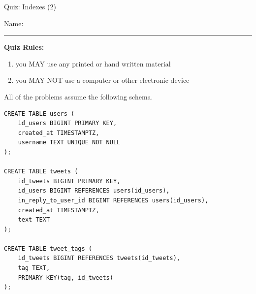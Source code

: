 \documentclass[12pt]{exam}
\theoremstyle{definition}
\begin{document}
\begin{center}
    {
\Large
    Quiz: Indexes (2)
}
\end{center}


\vspace{0.15in}

\vspace{0.25in}
\noindent
Name: 

\noindent
\rule{\textwidth}{0.1pt}
\vspace{0.15in}

\noindent
\textbf{Quiz Rules:} 

\noindent
\begin{enumerate}
\item you MAY use any printed or hand written material
\item you MAY NOT use a computer or other electronic device
\end{enumerate}
\newpage



\noindent
All of the problems assume the following schema.
\begin{lstlisting}
CREATE TABLE users (
    id_users BIGINT PRIMARY KEY,
    created_at TIMESTAMPTZ,
    username TEXT UNIQUE NOT NULL
);

CREATE TABLE tweets (
    id_tweets BIGINT PRIMARY KEY,
    id_users BIGINT REFERENCES users(id_users),
    in_reply_to_user_id BIGINT REFERENCES users(id_users),
    created_at TIMESTAMPTZ,
    text TEXT
);

CREATE TABLE tweet_tags (
    id_tweets BIGINT REFERENCES tweets(id_tweets),
    tag TEXT,
    PRIMARY KEY(tag, id_tweets)
);
\end{lstlisting}
\end{document}
